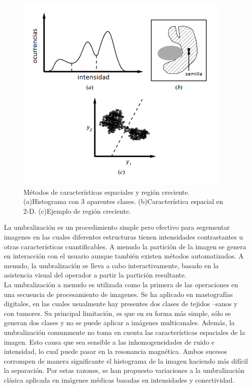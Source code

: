 \documentclass[12pt]{report}
\begin{document}
\begin{figure}[H]
\centering
\includegraphics[width = 10 cm, height = 10 cm]{umbral}
\caption{Métodos de características espaciales y región creciente. (a)Histograma con 3 aparentes clases. (b)Característica espacial en 2-D. (c)Ejemplo de región creciente.}
\end{figure}

La umbralización es un procedimiento simple pero efectivo para segementar imagenes en las cuales diferentes estructuras tienen intensidades contrastantes u otras características cuantificables. A menudo la partición de la imagen se genera en interacción con el usuario aunque también existen métodos automatizados. A menudo, la umbralización se lleva a cabo interactivamente, basado en la asistencia visual del operador a partir la partición resultante.\\

La umbralización a menudo es utilizada como la primera de las operaciones en una secuencia de procesamiento de imagenes. Se ha aplicado en mastografías digitales, en las cuales usualmente hay presentes dos clases de tejidos --sanos y con tumores. Su principal limitación, es que en su forma más simple, sólo se generan dos clases y no se puede aplicar a imágenes multicanales. Además, la umbralización comunmente no toma en cuenta las características espaciales de la imagen. Esto causa que sea sensible a las inhomogeneidades de ruido e intensidad, lo cual puede pasar en la resonancia magnética. Ambos sucesos corrompen de manera significante el histograma de la imagen haciendo más difícil la separación. Por estas razones, se han propuesto variaciones a la umbralización clásica aplicada en imágenes médicas basadas en intensidades y conectividad. \cite{metodos}
\end{document}
